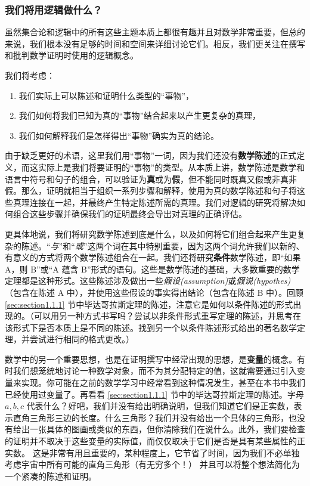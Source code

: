 \subsubsection*{我们将用逻辑做什么？}

虽然集合论和逻辑中的所有这些主题本质上都很有趣并且对数学非常重要，但总的来说，我们根本没有足够的时间和空间来详细讨论它们。相反，我们更关注在撰写和批判数学证明时使用的逻辑概念。

我们将考虑：

\begin{enumerate}
    \item 我们实际上可以陈述和证明什么类型的``事物''，
    \item 我们如何将我们已知为真的``事物''结合起来以产生更复杂的真理，
    \item 我们如何解释我们是怎样得出``事物''确实为真的结论。
\end{enumerate}

由于缺乏更好的术语，这里我们用``事物''一词，因为我们还没有\textbf{数学陈述}的正式定义，而这实际上是我们将要证明的``事物''的类型。从本质上讲，数学陈述是数学和语言中符号和句子的组合，可以验证为\textbf{真}或为\textbf{假}，但不能同时既真又假或非真非假。那么，证明就相当于组织一系列步骤和解释，使用为真的数学陈述和句子将这些真理连接在一起，并最终产生特定陈述所需的真理。我们对逻辑的研究将解决如何组合这些步骤并确保我们的证明最终会导出对真理的正确评估。

更具体地说，我们将研究数学陈述到底是什么，以及如何将它们组合起来产生更复杂的陈述。``\emph{与}''和``\emph{或}''这两个词在其中特别重要，因为这两个词允许我们以新的、有意义的方式将两个数学陈述组合在一起。我们还将研究\textbf{条件}数学陈述，即``如果 A，则 B''或``A 蕴含 B''形式的语句。这些是数学陈述的基础，大多数重要的数学定理都是这种形式。这些陈述涉及做出一些\emph{假设(assumption)}或\emph{假说(hypothes)}（包含在陈述 A 中），并使用这些假设的事实得出结论（包含在陈述 B 中）。回顾 \ref{sec:section1.1.1} 节中毕达哥拉斯定理的陈述，注意它是如何以条件陈述的形式出现的。（可以用另一种方式书写吗？尝试以非条件形式重写定理的陈述，并思考在该形式下是否本质上是不同的陈述。找到另一个以条件陈述形式给出的著名数学定理，并尝试进行相同的格式更改。）

数学中的另一个重要思想，也是在证明撰写中经常出现的思想，是\textbf{变量}的概念。有时我们想笼统地讨论一种数学对象，而不为其分配特定的值，这就需要通过引入变量来实现。你可能在之前的数学学习中经常看到这种情况发生，甚至在本书中我们已经使用过变量了。再看看 \ref{sec:section1.1.1} 节中的毕达哥拉斯定理的陈述。字母 $a,b,c$ 代表什么？好吧，我们并没有给出明确说明，但我们知道它们是正实数，表示直角三角形三边的长度。什么三角形？我们并没有给出一个具体的三角形，也没有给出一张具体的图画或类似的东西，但你清除我们在说什么。此外，我们要检查的证明并不取决于这些变量的实际值，而仅仅取决于它们是否是具有某些属性的正实数。 这是非常有用且重要的，某种程度上，它节省了时间，因为我们不必单独考虑宇宙中所有可能的直角三角形（有无穷多个！） 并且可以将整个想法简化为一个紧凑的陈述和证明。

